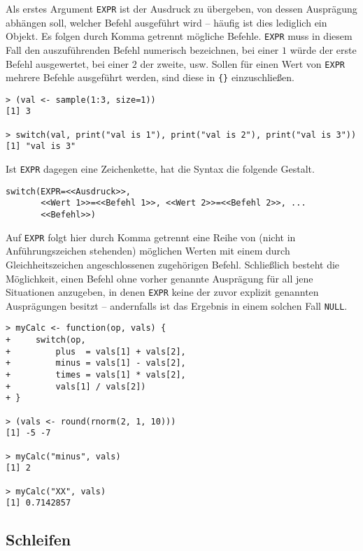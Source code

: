 Als erstes Argument \lstinline!EXPR! ist der Ausdruck zu übergeben, von dessen Ausprägung abhängen soll, welcher Befehl ausgeführt wird -- häufig ist dies lediglich ein Objekt. Es folgen durch Komma getrennt mögliche Befehle. \lstinline!EXPR! muss in diesem Fall den auszuführenden Befehl numerisch bezeichnen, bei einer $1$ würde der erste Befehl ausgewertet, bei einer $2$ der zweite, usw. Sollen für einen Wert von \lstinline!EXPR! mehrere Befehle ausgeführt werden, sind diese in \lstinline!{}! einzuschließen.
\begin{lstlisting}
> (val <- sample(1:3, size=1))
[1] 3

> switch(val, print("val is 1"), print("val is 2"), print("val is 3"))
[1] "val is 3"
\end{lstlisting}

Ist \lstinline!EXPR! dagegen eine Zeichenkette, hat die Syntax die folgende Gestalt.
\begin{lstlisting}
switch(EXPR=<<Ausdruck>>,
       <<Wert 1>>=<<Befehl 1>>, <<Wert 2>>=<<Befehl 2>>, ...
       <<Befehl>>)
\end{lstlisting}

Auf \lstinline!EXPR! folgt hier durch Komma getrennt eine Reihe von (nicht in Anführungszeichen stehenden) möglichen Werten mit einem durch Gleichheitszeichen angeschlossenen zugehörigen Befehl. Schließlich besteht die Möglichkeit, einen Befehl ohne vorher genannte Ausprägung für all jene Situationen anzugeben, in denen \lstinline!EXPR! keine der zuvor explizit genannten Ausprägungen besitzt -- andernfalls ist das Ergebnis in einem solchen Fall \lstinline!NULL!\@.
\begin{lstlisting}
> myCalc <- function(op, vals) {
+     switch(op,
+         plus  = vals[1] + vals[2],
+         minus = vals[1] - vals[2],
+         times = vals[1] * vals[2],
+         vals[1] / vals[2])
+ }

> (vals <- round(rnorm(2, 1, 10)))
[1] -5 -7

> myCalc("minus", vals)
[1] 2

> myCalc("XX", vals)
[1] 0.7142857
\end{lstlisting}

\subsection{Schleifen}
\label{sec:loops}

